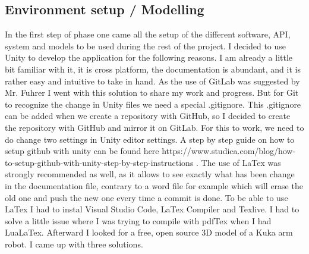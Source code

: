 \documentclass{scrartcl}
\begin{document}
\subsection{Environment setup / Modelling}

In the first step of phase one came all the setup of the different software, API, 
system and models to be used during the rest of the project. I decided to use Unity to develop the application for the following reasons.
I am already a little bit familiar with it, it is cross platform, the documentation is abundant, 
and it is rather easy and intuitive to take in hand. As the use of GitLab was suggested by Mr. Fuhrer 
I went with this solution to share my work and progress. But for Git to recognize the change in Unity 
files we need a special .gitignore. This .gitignore can be added when we create a repository with GitHub, 
so I decided to create the repository with GitHub and mirror it on GitLab. For this to work, we need to do 
change two settings in Unity editor settings. A step by step guide on how to setup github with unity 
can be found here https://www.studica.com/blog/how-to-setup-github-with-unity-step-by-step-instructions . 
The use of LaTex was strongly recommended as well, as it allows to see exactly what has been change in the documentation file, 
contrary to a word file for example which will erase the old one and push the new one every time a commit is done. 
To be able to use LaTex I had to instal Visual Studio Code, LaTex Compiler and Texlive. 
I had to solve a little issue where I was trying to compile with pdfTex when I had LuaLaTex. 
Afterward I looked for a free, open source 3D model of a Kuka arm robot. I came up with three solutions.
\end{document}
